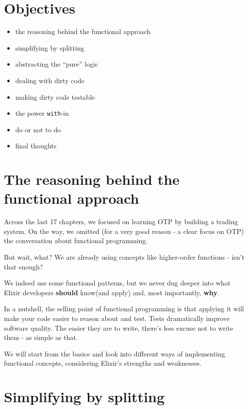 \documentclass[
  oneside]{book}
\providecommand{\tightlist}{%
  \setlength{\itemsep}{0pt}\setlength{\parskip}{0pt}}
\begin{document}
\section{Objectives}\label{objectives-17}

\begin{itemize}
\tightlist
\item
  the reasoning behind the functional approach
\item
  simplifying by splitting
\item
  abstracting the ``pure'' logic
\item
  dealing with dirty code
\item
  making dirty code testable
\item
  the power \texttt{with}-in
\item
  do or not to do
\item
  final thoughts
\end{itemize}

\section{The reasoning behind the functional approach}\label{the-reasoning-behind-the-functional-approach}

Across the last 17 chapters, we focused on learning OTP by building a trading system. On the way, we omitted (for a very good reason - a clear focus on OTP) the conversation about functional programming.

But wait, what? We are already using concepts like higher-order functions - isn't that enough?

We indeed use some functional patterns, but we never dug deeper into what Elixir developers \textbf{should} know(and apply) and, most importantly, \textbf{why}.

In a nutshell, the selling point of functional programming is that applying it will make your code easier to reason about and test. Tests dramatically improve software quality. The easier they are to write, there's less excuse not to write them - as simple as that.

We will start from the basics and look into different ways of implementing functional concepts, considering Elixir's strengths and weaknesses.

\section{Simplifying by splitting}\label{simplifying-by-splitting}
\end{document}

